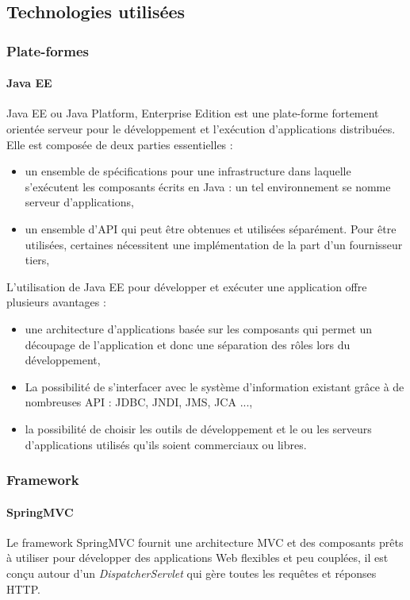 \subsection{Technologies utilisées}
\subsubsection{Plate-formes}
\paragraph{Java EE \\}
Java EE ou Java Platform, Enterprise Edition est une plate-forme fortement orientée serveur pour le développement et l'exécution d'applications distribuées. Elle est composée de deux parties essentielles :
\begin{itemize}
    \item un ensemble de spécifications pour une infrastructure dans laquelle s'exécutent les composants écrits en Java : un tel environnement se nomme serveur d'applications,
    \item 	un ensemble d'API qui peut être obtenues et utilisées séparément. Pour être utilisées, certaines nécessitent une implémentation de la part d'un fournisseur tiers,
\end{itemize}
L'utilisation de Java EE pour développer et exécuter une application offre plusieurs avantages :
\begin{itemize}
    \item une architecture d'applications basée sur les composants qui permet un découpage de l'application et donc une séparation des rôles lors du développement,
    \item La possibilité de s'interfacer avec le système d'information existant grâce à de nombreuses API : JDBC, JNDI, JMS, JCA ...,
    \item 	la possibilité de choisir les outils de développement et le ou les serveurs d'applications utilisés qu'ils soient commerciaux ou libres.
\end{itemize}

\subsubsection{Framework}
\paragraph{SpringMVC \\}
Le framework SpringMVC fournit une architecture MVC et des composants prêts à utiliser pour développer des applications Web flexibles et peu couplées, il est conçu autour d'un \textit{DispatcherServlet} qui gère toutes les requêtes et réponses HTTP.
